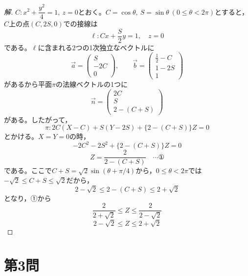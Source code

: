 \documentclass[../main.tex]{subfiles}
\begin{document}
\begin{proof}[解]
  $C: x^2+\dfrac{y^2}{4}=1,\ z=0$とおく。$C=\cos\theta,\ S=\sin\theta\ (0\le\theta<2\pi)$とすると，$C$上の点$(C,2S,0)$での接線は
  \[
    \ell: Cx+\frac{S}{2}y=1, \quad z=0
  \]
  である。$\ell$に含まれる2つの1次独立なベクトルに
  \[
    \vec a=
    \begin{pmatrix}S\\-2C\\0
    \end{pmatrix}, \qquad
    \vec b=
    \begin{pmatrix}\frac12-C\\1-2S\\1
    \end{pmatrix}
  \]
  があるから平面$\pi$の法線ベクトルの1つに
  \[
    \vec n=
    \begin{pmatrix}2C\\S\\2-(C+S)
    \end{pmatrix}
  \]
  がある。したがって，
  \[
    \pi: 2C(X-C)+S(Y-2S)+\{2-(C+S)\}Z=0
  \]
  とかける。$X=Y=0$の時，
  \[
    -2C^2-2S^2+\{2-(C+S)\}Z=0
  \]
  \[
    Z=\frac{2}{2-(C+S)} \quad\cdots\text{①}
  \]
  である。ここで$C+S=\sqrt2\sin(\theta+\pi/4)$から，$0\le\theta<2\pi$では$-\sqrt2\le C+S\le\sqrt2$だから，
  \[
    2-\sqrt2\le2-(C+S)\le2+\sqrt2
  \]
  となり，①から
  \[
    \frac{2}{2+\sqrt2}\le Z\le\frac{2}{2-\sqrt2}
  \]
  \[
    2-\sqrt2\le Z\le2+\sqrt2
  \]
\end{proof}

\newpage

\section*{第3問}
\end{document}
